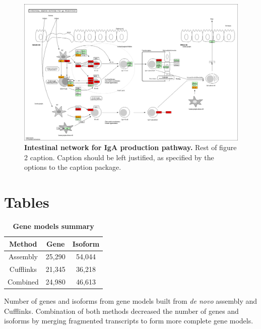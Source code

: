 \documentclass[10pt]{article}
\begin{document}
\begin{figure}[!ht]
\begin{center}
\includegraphics[width=6in]{line67_KEGG_gga04672.png}
\end{center}
\caption{
{\bf Intestinal network for IgA production pathway.}  Rest of figure 2  caption.  Caption 
should be left justified, as specified by the options to the caption 
package.
}
\label{KEGG_IgA}
\end{figure}

\section*{Tables}

\begin{table}[!ht]
\caption{
\bf{Gene models summary}}
\begin{tabular}{ccc}
\hline
Method & Gene & Isoform \\
\hline
Assembly & 25,290 & 54,044 \\
Cufflinks & 21,345 & 36,218 \\
Combined & 24,980 & 46,613 \\
\hline
\end{tabular}
\begin{flushleft}Number of genes and isoforms from gene models
built from \emph{de novo} assembly and Cufflinks.
Combination of both methods decreased the number of genes
and isoforms by merging fragmented transcripts to
form more complete gene models.
\end{flushleft}
\label{tab:gene_models}
\end{table}
\end{document}
